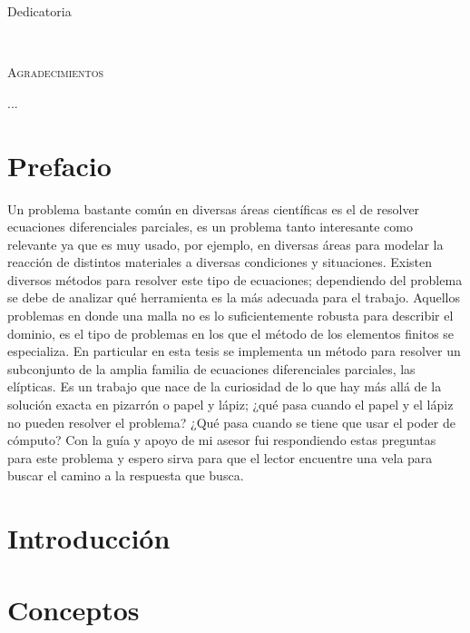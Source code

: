 \documentclass[12pt,spanish,oneside]{book}
\theoremstyle{plain}
\numberwithin{equation}{chapter}
\theoremstyle{definition}
\theoremstyle{remark}
\begin{document}
\newpage
\vspace*{\fill}
\begin{flushright}
Dedicatoria
\vfill
\end{flushright}
\newpage
\mbox{ }
\vspace{80pt}
\begin{flushright}
\textsc{\large Agradecimientos} \\
\vspace{12pt}

...
\end{flushright}

\chapter*{Prefacio}

Un problema bastante común en diversas áreas científicas es el de resolver ecuaciones diferenciales parciales, es un problema tanto interesante como relevante ya que es muy usado, por ejemplo, en diversas áreas para modelar la reacción de distintos materiales a diversas condiciones y situaciones. Existen diversos métodos para resolver este tipo de ecuaciones; dependiendo del problema se debe de analizar qué herramienta es la más adecuada para el trabajo. Aquellos problemas en donde una malla no es lo suficientemente robusta para describir el dominio, es el tipo de problemas en los que el método de los elementos finitos se especializa. En particular en esta tesis se implementa un método para resolver un subconjunto de la amplia familia de ecuaciones diferenciales parciales, las elípticas. Es un trabajo que nace de la curiosidad de lo que hay más allá de la solución exacta en pizarrón o papel y lápiz; ¿qué pasa cuando el papel y el lápiz no pueden resolver el problema? ¿Qué pasa cuando se tiene que usar el poder de cómputo? Con la guía y apoyo de mi asesor fui respondiendo estas preguntas para este problema y espero sirva para que el lector encuentre una vela para buscar el camino a la respuesta que busca. 

\frontmatter


\tableofcontents

\mainmatter
\chapter{Introducción}

\chapter{Conceptos} 
\end{document}
